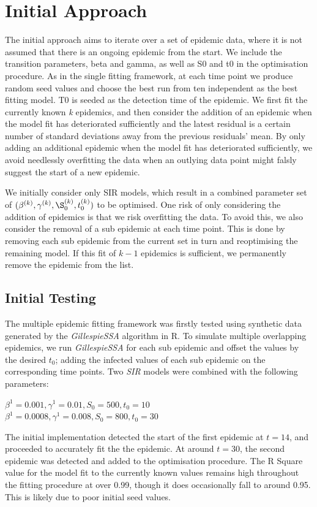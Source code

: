 \section{Initial Approach}
The initial approach aims to iterate over a set of epidemic data,
where it is not assumed that there is an ongoing epidemic from the
start. We include the transition parameters, beta and gamma, as well
as S0 and t0 in the optimisation procedure. As in the single fitting
framework, at each time point we produce random seed values and choose
the best run from ten independent as the best fitting model. T0 is
seeded as the detection time of the epidemic. We first fit the
currently known \emph{k} epidemics, and then consider the addition of
an epidemic when the model fit has deteriorated sufficiently and
the latest residual is a certain number of standard deviations away
from the previous residuals' mean. By only adding an additional
epidemic when the model fit has deteriorated sufficiently, we avoid
needlessly overfitting the data when an outlying data point might
falsly suggest the start of a new epidemic.

We initially consider only SIR models, which result in a combined
parameter set of $(\beta^{(k)},\gamma^{(k)},\S_{0}^{(k)},t_0^{(k)})$ to
be optimised. One risk of only considering the addition of epidemics
is that we risk overfitting the data. To avoid this, we also consider the removal of a
sub epidemic at each time point. This is done by removing each sub
epidemic from the current set in turn and reoptimising the remaining
model. If this fit of $k-1$ epidemics is sufficient, we
permanently remove the epidemic from the list.

\subsection{Initial Testing}
The multiple epidemic fitting framework was firstly tested using
synthetic data generated by the \emph{GillespieSSA} algorithm in R. To
simulate multiple overlapping epidemics, we run \emph{GillespieSSA}
for each sub epidemic and offset the values by the desired $t_0$;
adding the infected values of each sub epidemic on the corresponding
time points. Two \emph{SIR} models were combined with the following
parameters:

$\beta^1=0.001, \gamma^1 = 0.01, S_0 = 500, t_0 = 10$\\
$\beta^1=0.0008, \gamma^1 = 0.008, S_0 = 800, t_0 = 30$

The initial implementation detected the start of the first epidemic at
$t = 14$, and proceeded to accurately fit the the epidemic. At around
$t = 30$, the second epidemic was detected and added to the
optimisation procedure. The R Square value for the model fit to the
currently known values remains high throughout the fitting procedure
at over 0.99, though it does occasionally fall to around 0.95. This is
likely due to poor initial seed values.

